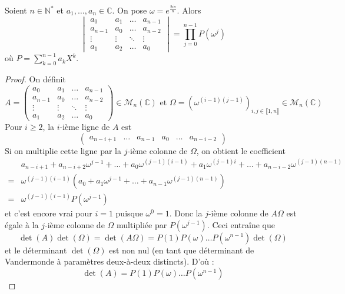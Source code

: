 





	\begin{lemma}
		\label{suite-de-polygones-1}
		Soient $n \in \mathbb{N}^*$ et $a_1, \dots, a_n \in \mathbb{C}$. On pose $\omega = e^{\frac{2i\pi}{n}}$. Alors
		\[ \begin{vmatrix} a_0 & a_1 & \dots & a_{n-1} \\ a_{n-1} & a_0 & \dots & a_{n-2}\\ \vdots & \vdots & \ddots & \vdots \\ a_1 & a_2 & \dots & a_0 \end{vmatrix} = \prod_{j=0}^{n-1} P(\omega^j) \]
		où $P = \sum_{k=0}^{n-1} a_k X^k$.
	\end{lemma}

	\begin{proof}
		On définit
		\[ A = \begin{pmatrix} a_0 & a_1 & \dots & a_{n-1} \\ a_{n-1} & a_0 & \dots & a_{n-2}\\ \vdots & \vdots & \ddots & \vdots \\ a_1 & a_2 & \dots & a_0 \end{pmatrix} \in \mathcal{M}_n(\mathbb{C}) \text{ et } \Omega = (\omega^{(i-1)(j-1)})_{i, j \in \llbracket 1, n \rrbracket} \in \mathcal{M}_n(\mathbb{C}) \]
		Pour $i \geq 2$, la $i$-ième ligne de $A$ est
		\[ \begin{pmatrix} a_{n-i+1} & \dots & a_{n-1} & a_0 & \dots & a_{n-i-2} \end{pmatrix} \]
		Si on multiplie cette ligne par la $j$-ième colonne de $\Omega$, on obtient le coefficient
		\begin{align*}
			&a_{n-i+1} + a_{n-i+2} \omega^{j-1} + \dots + a_0 \omega^{(j-1)(i-1)} + a_1 \omega^{(j-1)i} + \dots + a_{n-i-2} \omega^{(j-1)(n-1)} \\
			=& \omega^{(j-1)(i-1)} (a_0 + a_1 \omega^{j-1} + \dots + a_{n-1} \omega^{(j-1)(n-1)}) \\
			=& \omega^{(j-1)(i-1)} P(\omega^{j-1})
		\end{align*}
		et c'est encore vrai pour $i = 1$ puisque $\omega^0 = 1$. Donc la $j$-ième colonne de $A \Omega$ est égale à la $j$-ième colonne de $\Omega$ multipliée par $P(\omega^{j-1})$. Ceci entraîne que
		\[ \det(A) \det(\Omega) = \det(A\Omega) = P(1) P(\omega) \dots P(\omega^{n-1}) \det(\Omega) \]
		et le déterminant $\det(\Omega)$ est non nul (en tant que déterminant de Vandermonde à paramètres deux-à-deux distincts). D'où :
		\[ \det(A) = P(1) P(\omega) \dots P(\omega^{n-1}) \]
	\end{proof}

